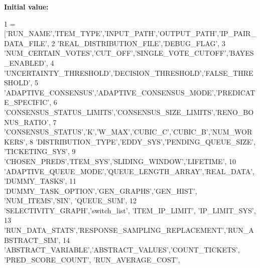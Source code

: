 {\bfseries Initial value\+:}
\begin{DoxyCode}
1 =   [\textcolor{stringliteral}{'RUN\_NAME'},\textcolor{stringliteral}{'ITEM\_TYPE'},\textcolor{stringliteral}{'INPUT\_PATH'},\textcolor{stringliteral}{'OUTPUT\_PATH'},\textcolor{stringliteral}{'IP\_PAIR\_DATA\_FILE'},
2             \textcolor{stringliteral}{'REAL\_DISTRIBUTION\_FILE'},\textcolor{stringliteral}{'DEBUG\_FLAG'},
3             \textcolor{stringliteral}{'NUM\_CERTAIN\_VOTES'},\textcolor{stringliteral}{'CUT\_OFF'},\textcolor{stringliteral}{'SINGLE\_VOTE\_CUTOFF'},\textcolor{stringliteral}{'BAYES\_ENABLED'},
4             \textcolor{stringliteral}{'UNCERTAINTY\_THRESHOLD'},\textcolor{stringliteral}{'DECISION\_THRESHOLD'},\textcolor{stringliteral}{'FALSE\_THRESHOLD'},
5             \textcolor{stringliteral}{'ADAPTIVE\_CONSENSUS'},\textcolor{stringliteral}{'ADAPTIVE\_CONSENSUS\_MODE'},\textcolor{stringliteral}{'PREDICATE\_SPECIFIC'},
6             \textcolor{stringliteral}{'CONSENSUS\_STATUS\_LIMITS'},\textcolor{stringliteral}{'CONSENSUS\_SIZE\_LIMITS'},\textcolor{stringliteral}{'RENO\_BONUS\_RATIO'},
7             \textcolor{stringliteral}{'CONSENSUS\_STATUS'},\textcolor{stringliteral}{'K'},\textcolor{stringliteral}{'W\_MAX'},\textcolor{stringliteral}{'CUBIC\_C'},\textcolor{stringliteral}{'CUBIC\_B'},\textcolor{stringliteral}{'NUM\_WORKERS'},
8             \textcolor{stringliteral}{'DISTRIBUTION\_TYPE'},\textcolor{stringliteral}{'EDDY\_SYS'},\textcolor{stringliteral}{'PENDING\_QUEUE\_SIZE'}, \textcolor{stringliteral}{'TICKETING\_SYS'},
9             \textcolor{stringliteral}{'CHOSEN\_PREDS'},\textcolor{stringliteral}{'ITEM\_SYS'},\textcolor{stringliteral}{'SLIDING\_WINDOW'},\textcolor{stringliteral}{'LIFETIME'},
10             \textcolor{stringliteral}{'ADAPTIVE\_QUEUE\_MODE'},\textcolor{stringliteral}{'QUEUE\_LENGTH\_ARRAY'},\textcolor{stringliteral}{'REAL\_DATA'}, \textcolor{stringliteral}{'DUMMY\_TASKS'},
11             \textcolor{stringliteral}{'DUMMY\_TASK\_OPTION'},\textcolor{stringliteral}{'GEN\_GRAPHS'},\textcolor{stringliteral}{'GEN\_HIST'}, \textcolor{stringliteral}{'NUM\_ITEMS'},\textcolor{stringliteral}{'SIN'}, \textcolor{stringliteral}{'QUEUE\_SUM'},
12             \textcolor{stringliteral}{'SELECTIVITY\_GRAPH'},\textcolor{stringliteral}{'switch\_list'}, \textcolor{stringliteral}{'ITEM\_IP\_LIMIT'}, \textcolor{stringliteral}{'IP\_LIMIT\_SYS'},
13             \textcolor{stringliteral}{'RUN\_DATA\_STATS'},\textcolor{stringliteral}{'RESPONSE\_SAMPLING\_REPLACEMENT'},\textcolor{stringliteral}{'RUN\_ABSTRACT\_SIM'},
14             \textcolor{stringliteral}{'ABSTRACT\_VARIABLE'},\textcolor{stringliteral}{'ABSTRACT\_VALUES'},\textcolor{stringliteral}{'COUNT\_TICKETS'}, \textcolor{stringliteral}{'PRED\_SCORE\_COUNT'}, \textcolor{stringliteral}{'RUN\_AVERAGE\_COST'},

\end{DoxyCode}
